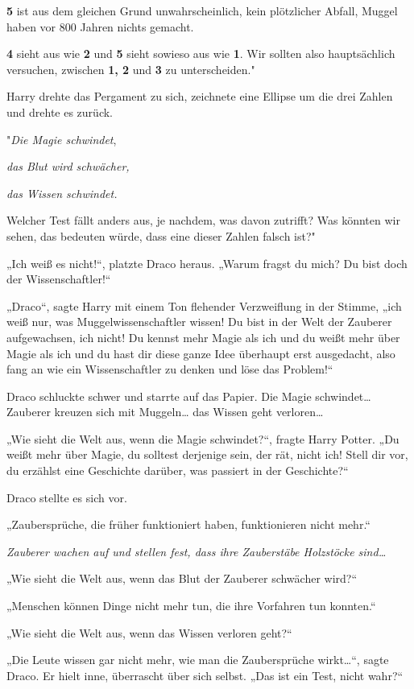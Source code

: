 {\textbf{5} ist aus dem gleichen Grund unwahrscheinlich, kein plötzlicher Abfall, Muggel haben vor 800 Jahren nichts gemacht.

\textbf{4} sieht aus wie \textbf{2} und \textbf{5} sieht sowieso aus wie \textbf{1}. Wir sollten also hauptsächlich versuchen, zwischen \textbf{1, 2} und \textbf{3} zu unterscheiden."

Harry drehte das Pergament zu sich, zeichnete eine Ellipse um die drei Zahlen und drehte es zurück.

"\emph{Die Magie schwindet},

\emph{das Blut wird schwächer,}

\emph{das Wissen schwindet.}

Welcher Test fällt anders aus, je nachdem, was davon zutrifft? Was könnten wir sehen, das bedeuten würde, dass eine dieser Zahlen falsch ist?"

„Ich weiß es nicht!“, platzte Draco heraus. „Warum fragst du mich? Du bist doch der Wissenschaftler!“

„Draco“, sagte Harry mit einem Ton flehender Verzweiflung in der Stimme, „ich weiß nur, was Muggelwissenschaftler wissen! Du bist in der Welt der Zauberer aufgewachsen, ich nicht! Du kennst mehr Magie als ich und du weißt mehr über Magie als ich und du hast dir diese ganze Idee überhaupt erst ausgedacht, also fang an wie ein Wissenschaftler zu denken und löse das Problem!“

Draco schluckte schwer und starrte auf das Papier. Die Magie schwindet… Zauberer kreuzen sich mit Muggeln… das Wissen geht verloren…

„Wie sieht die Welt aus, wenn die Magie schwindet?“, fragte Harry Potter. „Du weißt mehr über Magie, du solltest derjenige sein, der rät, nicht ich! Stell dir vor, du erzählst eine Geschichte darüber, was passiert in der Geschichte?“

Draco stellte es sich vor.

„Zaubersprüche, die früher funktioniert haben, funktionieren nicht mehr.“

\emph{Zauberer wachen auf und stellen fest, dass ihre Zauberstäbe Holzstöcke sind…}

„Wie sieht die Welt aus, wenn das Blut der Zauberer schwächer wird?“

„Menschen können Dinge nicht mehr tun, die ihre Vorfahren tun konnten.“

„Wie sieht die Welt aus, wenn das Wissen verloren geht?“

„Die Leute wissen gar nicht mehr, wie man die Zaubersprüche wirkt…“, sagte Draco. Er hielt inne, überrascht über sich selbst. „Das ist ein Test, nicht wahr?“

}

